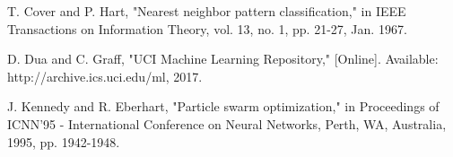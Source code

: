 \documentclass[conference]{IEEEtran}
\begin{document}
\begin{thebibliography}{00}
 T. Cover and P. Hart, "Nearest neighbor pattern classification," in IEEE Transactions on Information Theory, vol. 13, no. 1, pp. 21-27, Jan. 1967.

 D. Dua and C. Graff, "UCI Machine Learning Repository," [Online]. Available: http://archive.ics.uci.edu/ml, 2017.

 J. Kennedy and R. Eberhart, "Particle swarm optimization," in Proceedings of ICNN'95 - International Conference on Neural Networks, Perth, WA, Australia, 1995, pp. 1942-1948.
\end{thebibliography}
\end{document}
